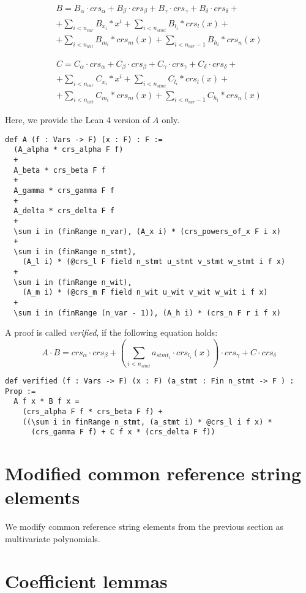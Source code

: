 \documentclass{article}
\theoremstyle{definition}
\theoremstyle{remark}
\begin{document}
\begin{multline}
B = B_{\alpha} \cdot crs_{\alpha} + B_{\beta} \cdot crs_{\beta} + B_{\gamma} \cdot crs_{\gamma} + B_{\delta} \cdot crs_{\delta} + \\
    + \sum \limits_{i < n_{var}} B_{x_i} * x^i + \sum \limits_{i < n_{stmt}} B_{l_i} * crs_l(x) + \\
    + \sum \limits_{i < n_{wit}} B_{m_i} * crs_m(x) + \sum \limits_{i < n_{var} - 1} B_{h_i} * crs_n(x)
\end{multline}

\begin{multline}
C = C_{\alpha} \cdot crs_{\alpha} + C_{\beta} \cdot crs_{\beta} + C_{\gamma} \cdot crs_{\gamma} + C_{\delta} \cdot crs_{\delta} + \\
    + \sum \limits_{i < n_{var}} C_{x_i} * x^i + \sum \limits_{i < n_{stmt}} C_{l_i} * crs_l(x) + \\
    + \sum \limits_{i < n_{wit}} C_{m_i} * crs_m(x) + \sum \limits_{i < n_{var} - 1} C_{h_i} * crs_n(x)
\end{multline}

Here, we provide the Lean 4 version of $A$ only.

\begin{lstlisting}
def A (f : Vars -> F) (x : F) : F :=
  (A_alpha * crs_alpha F f)
  +
  A_beta * crs_beta F f
  +
  A_gamma * crs_gamma F f
  +
  A_delta * crs_delta F f
  +
  \sum i in (finRange n_var), (A_x i) * (crs_powers_of_x F i x)
  +
  \sum i in (finRange n_stmt),
    (A_l i) * (@crs_l F field n_stmt u_stmt v_stmt w_stmt i f x)
  +
  \sum i in (finRange n_wit),
    (A_m i) * (@crs_m F field n_wit u_wit v_wit w_wit i f x)
  +
  \sum i in (finRange (n_var - 1)), (A_h i) * (crs_n F r i f x)
\end{lstlisting}

A proof is called \emph{verified}, if the following equation holds:
\begin{equation}
A \cdot B = crs_{\alpha} \cdot crs_{\beta} + (\sum \limits_{i < n_{stmt}} a_{{stmt}_i} \cdot crs_{l_i}(x)) \cdot crs_{\gamma} + C \cdot crs_{\delta}
\end{equation}

\begin{lstlisting}
def verified (f : Vars -> F) (x : F) (a_stmt : Fin n_stmt -> F ) : Prop :=
  A f x * B f x =
    (crs_alpha F f * crs_beta F f) +
    ((\sum i in finRange n_stmt, (a_stmt i) * @crs_l i f x) *
      (crs_gamma F f) + C f x * (crs_delta F f))
\end{lstlisting}

\section{Modified common reference string elements}

We modify common reference string elements from the previous section as multivariate polynomials.

\section{Coefficient lemmas}
\end{document}
